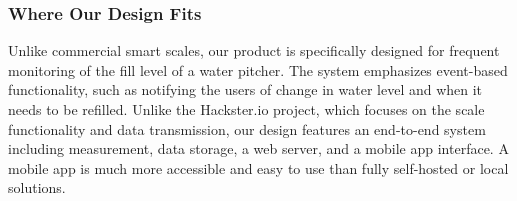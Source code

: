 \subsubsection*{Where Our Design Fits}

Unlike commercial smart scales, our product is specifically designed for frequent monitoring of the fill level of a water pitcher. The system emphasizes event-based functionality, such as notifying the users of change in water level and when it needs to be refilled. Unlike the Hackster.io project, which focuses on the scale functionality and data transmission, our design features an end-to-end system including measurement, data storage, a web server, and a mobile app interface. A mobile app is much more accessible and easy to use than fully self-hosted or local solutions. 